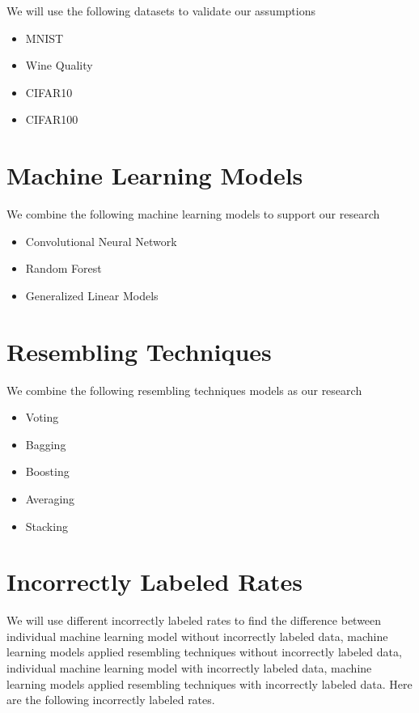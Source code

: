 \documentclass{article}
\begin{document}
We will use the following datasets to validate our assumptions

\begin{itemize}
    \item MNIST
    \item Wine Quality
    \item CIFAR10
    \item CIFAR100
\end{itemize}

\section{Machine Learning Models}

We combine the following machine learning models to support our research


\begin{itemize}
    \item Convolutional Neural Network
    \item Random Forest
    \item Generalized Linear Models 
\end{itemize}


\section{Resembling Techniques}

We combine the following resembling techniques models as our research


\begin{itemize}
    \item Voting
    \item Bagging
    \item Boosting
    \item Averaging
    \item Stacking
\end{itemize}

\section{Incorrectly Labeled Rates}

We will use different incorrectly labeled rates to find the difference between individual machine learning model without incorrectly labeled data, machine learning models applied resembling techniques without incorrectly labeled data, individual machine learning model with incorrectly labeled data, machine learning models applied resembling techniques with incorrectly labeled data. Here are the following incorrectly labeled rates. 
\end{document}
